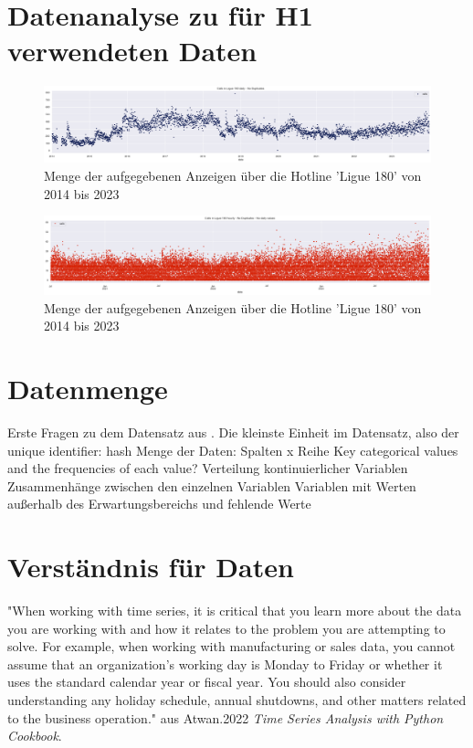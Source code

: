 \documentclass[12pt]{report}
\begin{document}
	\section{Datenanalyse zu für H1 verwendeten Daten}
	\begin{figure}
		\centering
		\includegraphics[width=1\linewidth]{calls_daily}
		\caption[Menge der Anzeigen pro Tag von 2014 bis 2023]{Menge der aufgegebenen Anzeigen über die Hotline 'Ligue 180' von 2014 bis 2023}
		\label{fig:callsdaily}
	\end{figure}
	\begin{figure}
		\centering
		\includegraphics[width=1\linewidth]{calls_hourly}
		\caption[Menge der Anzeigen pro Tag von 2014 bis 2023]{Menge der aufgegebenen Anzeigen über die Hotline 'Ligue 180' von 2014 bis 2023}
		\label{fig:callshourly}
	\end{figure}
	
	\section{Datenmenge}
	Erste Fragen zu dem Datensatz aus \cite[S.77f.]{Walker.2024}.
	Die kleinste Einheit im Datensatz, also der unique identifier: hash
	Menge der Daten: Spalten x Reihe
	Key categorical values and the frequencies of each value?
	Verteilung kontinuierlicher Variablen
	Zusammenhänge zwischen den einzelnen Variablen
	Variablen mit Werten außerhalb des Erwartungsbereichs und fehlende Werte
	
	\section{Verständnis für Daten}
	"When working with time series, it is critical that you learn more about the data you are working with and how it relates to the problem you are attempting to solve. For example, when working with manufacturing or sales data, you cannot assume that an organization's working day is Monday to Friday or whether it uses the standard calendar year or fiscal year. You should also consider understanding any holiday schedule, annual shutdowns, and other matters related to the business operation." aus Atwan.2022 \textit{Time Series Analysis with Python Cookbook}.
\end{document}
